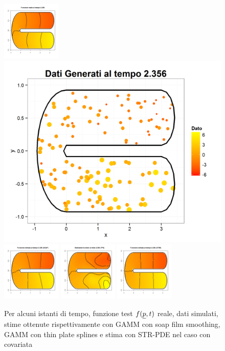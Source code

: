 \documentclass[a4paper,11pt,twoside,openright]{book}							%
\begin{document}
\begin{landscape}
\begin{figure}
\includegraphics[width=0.25\textwidth]{immagini/simulazioni_covar/REALEtempo4.png}
\includegraphics[height=0.25\textwidth]{immagini/simulazioni_covar/Dati_tempo4.png}
\includegraphics[width=0.25\textwidth]{immagini/simulazioni_covar/SOAPtempo4.png}
\includegraphics[width=0.25\textwidth]{immagini/simulazioni_covar/TPStempo4.png}
\includegraphics[width=0.25\textwidth]{immagini/simulazioni_covar/STSRtempo4.png}

\caption{Per alcuni istanti di tempo, funzione test $f(\protect\underline{p},t)$ reale, dati simulati, stime ottenute rispettivamente con GAMM con soap film smoothing, GAMM con thin plate splines e stima con STR-PDE nel caso con covariata}
\label{fig:confronto_altri_metodi_cov}
\end{figure}
\end{landscape}
\end{document}
